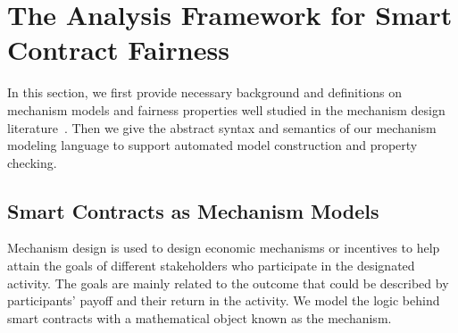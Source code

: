 










\section{The Analysis Framework for Smart Contract Fairness}
\label{section:mechanism_property}


In this section, we first provide necessary background and definitions on mechanism models and
fairness properties well studied in the mechanism design
literature~\cite{jackson2014mechanism,nisan2001algorithmic}.
Then we give the abstract syntax and semantics of our mechanism modeling language to support
automated model construction and property checking.

\subsection{Smart Contracts as Mechanism Models}\label{sec:mechanism-model}
Mechanism design is used to design economic mechanisms or incentives to help attain the goals of
different stakeholders who participate in the designated activity.
The goals are mainly related to the outcome that could be described by participants' payoff and
their return in the activity.
We model the logic behind smart contracts with a mathematical object known as the mechanism.


